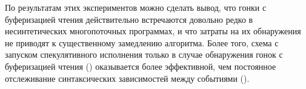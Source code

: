 По результатам этих экспериментов можно сделать вывод, 
что гонки с буферизацией чтения действительно встречаются 
довольно редко в несинтетических многопоточных программах, 
и что затраты на их обнаружения не приводят к существенному
замедлению алгоритма. Более того, схема с 
запуском спекулятивного исполнения только в случае 
обнаружения гонок с буферизацией чтения (\wmc) 
оказывается более эффективной, чем постоянное отслеживание 
синтаксических зависимостей между событиями (\hmc). 





